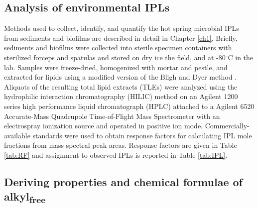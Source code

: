 \subsection{Analysis of environmental IPLs} Methods used to collect, identify, and quantify the hot spring microbial IPLs from sediments and biofilms are described in detail in Chapter \ref{ch1}. Briefly, sediments and biofilms were collected into sterile specimen containers with sterilized forceps and spatulas and stored on dry ice the field, and at -80$^{\circ}$C in the lab. Samples were freeze-dried, homogenized with mortar and pestle, and extracted for lipids using a modified version of the Bligh and Dyer method \citep{white1998signature}. Aliquots of the resulting total lipid extracts (TLEs) were analyzed using the hydrophilic interaction chromatography (HILIC) method \citep{Wrmer_Application_2013} on an Agilent 1200 series high performance liquid chromatograph (HPLC) attached to a Agilent 6520 Accurate-Mass Quadrupole Time-of-Flight Mass Spectrometer with an electrospray ionization source and operated in positive ion mode. Commercially-available standards were used to obtain response factors for calculating IPL mole fractions from mass spectral peak areas. Response factors are given in Table \ref{tab:RF} and assignment to observed IPLs is reported in Table \ref{tab:IPL}.

\subsection{Deriving properties and chemical formulae of alkyl\textsubscript{free}}

